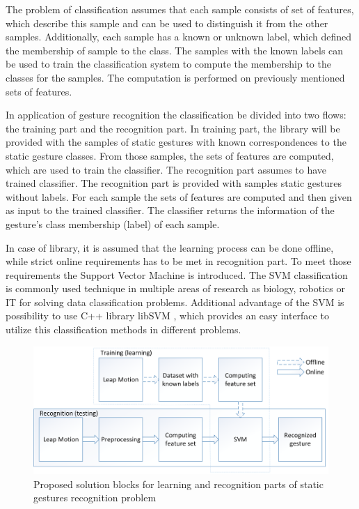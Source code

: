 
The problem of classification assumes that each sample consists of set of features, which describe this sample and can be used to distinguish it from the other samples.
Additionally, each sample has a known or unknown label, which defined the membership of sample to the class. 
The samples with the known labels can be used to train the classification system to compute the membership to the classes for the samples. 
The computation is performed on previously mentioned sets of features.

In application of gesture recognition the classification be divided into two flows: the training part and the recognition part. 
In training part, the library will be provided with the samples of static gestures with known correspondences to the static gesture classes. 
From those samples, the sets of features are computed, which are used to train the classifier.
The recognition part assumes to have trained classifier. 
The recognition part is provided with samples static gestures without labels. 
For each sample the sets of features are computed and then given as input to the trained classifier.
The classifier returns the information of the gesture's class membership (label) of each sample.

In case of library, it is assumed that the learning process can be done offline, while strict online requirements has to be met in recognition part. 
To meet those requirements the Support Vector Machine is introduced\cite{Cortes:SVM}. 
The SVM classification is commonly used technique in multiple areas of research as biology, robotics or IT for solving data classification problems.
Additional advantage of the SVM is possibility to use C++ library libSVM \cite{libSVM}, which provides an easy interface to utilize this classification methods in different problems.

\begin{figure}[htb]
\centering
 \includegraphics[width=1\columnwidth]{figures/StaticGestures.png}
 \caption[]{Proposed solution blocks for learning and recognition parts of static gestures recognition problem}
 \label{staticsol}
\end{figure}



